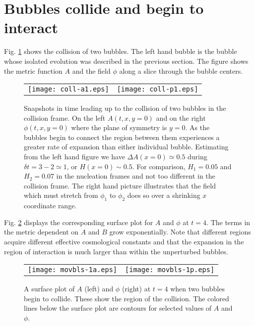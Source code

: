 \documentclass[preprintnumbers,eqsecnum,aps,prd,epsf,showpacs,nofootinbib
]{revtex4}
\begin{document}
\section{Bubbles collide and begin to interact}
Fig. \ref{fig-coll2} shows the collision of two bubbles.  The left
hand bubble is the bubble whose isolated evolution was described in
the previous section.  The figure shows the metric function $A$ and
the field $\phi$ along a slice through the bubble centers.

\begin{figure}[htbp]
\begin{center}
\begin{tabular}{ll}
\texttt{[image: coll-a1.eps]} &
\hspace{0.5cm}
\texttt{[image: coll-p1.eps]}
\end{tabular}
\end{center}
\caption{Snapshots in time leading up to the collision of two bubbles
  in the collision frame.  On the left $A(t,x,y=0)$ and on the right
  $\phi(t,x,y=0)$ where the plane of symmetry is $y=0$. As the bubbles
  begin to connect the region between them experiences a greater rate
  of expansion than either individual bubble. Estimating from the left
  hand figure we have $\Delta A(x=0)\simeq 0.5$ during $\delta t = 3 -
  2 \simeq 1$, or $H(x=0) \sim 0.5$. For comparison, $H_1=0.05$ and
  $H_2=0.07$ in the nucleation frames and not too different in the
  collision frame. The right hand picture illustrates that the field
  which must stretch from $\phi_1$ to $\phi_2$ does so over a
  shrinking $x$ coordinate range.}
\label{fig-coll2}
\end{figure}

Fig. \ref{fig-coll1} displays the corresponding surface plot for $A$
and $\phi$ at $t=4$.  The terms in the metric dependent on $A$ and $B$
grow exponentially. Note that different regions acquire different
effective cosmological constants and that the expansion in the region
of interaction is much larger than within the unperturbed bubbles.

\begin{figure}[htbp]
\begin{center}
\begin{tabular}{ll}
\texttt{[image: movbls-1a.eps]} &
\hspace{0.5cm}
\texttt{[image: movbls-1p.eps]}
\end{tabular}
\end{center}
\caption{A surface plot of $A$ (left) and $\phi$ (right) at $t=4$ when
  two bubbles begin to collide. These show the region of the
  collision. The colored lines below the surface plot are contours for selected
  values of $A$ and $\phi$. 
}
\label{fig-coll1}
\end{figure}
\end{document}
